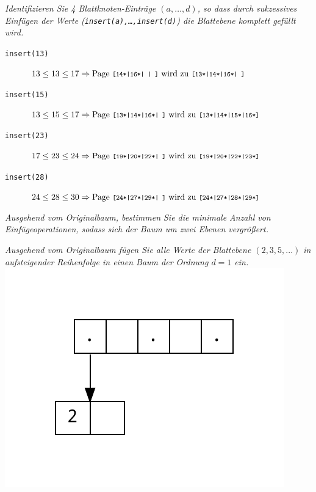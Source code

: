 \documentclass{uni_tue_template}
\newcommand{\code}[1]{\texttt{{\footnotesize #1}}}
\begin{document}
\exercise{}
  \item \emph{Identifizieren Sie 4 Blattknoten-Einträge $(a,\ldots,d)$, so dass durch sukzessives Einfügen der Werte (\code{insert(a),\ldots,insert(d)}) die Blattebene komplett gefüllt wird.}
  \begin{description}
    \item[\code{insert(13)}] $13 \leq 13 \leq 17 \Rightarrow \text{Page \code{[14*|16*|   |   ]} wird zu \code{[13*|14*|16*|   ]}}$
    \item[\code{insert(15)}] $13 \leq 15 \leq 17 \Rightarrow \text{Page \code{[13*|14*|16*|   ]} wird zu \code{[13*|14*|15*|16*]}}$
    \item[\code{insert(23)}] $17 \leq 23 \leq 24 \Rightarrow \text{Page \code{[19*|20*|22*|   ]} wird zu \code{[19*|20*|22*|23*]}}$
    \item[\code{insert(28)}] $24 \leq 28 \leq 30 \Rightarrow \text{Page \code{[24*|27*|29*|   ]} wird zu \code{[24*|27*|28*|29*]}}$
  \end{description}
  \item \emph{Ausgehend vom Originalbaum, bestimmen Sie die minimale Anzahl von Einfügeoperationen, sodass
  sich der Baum um zwei Ebenen vergrößert.}\\
  \item \emph{Ausgehend vom Originalbaum fügen Sie alle Werte der Blattebene $(2, 3, 5, . . .)$ in aufsteigender Reihenfolge in einen Baum der Ordnung $d = 1$ ein.}\\
  \includegraphics[scale=0.4]{./dot/A1_1-01.pdf}\\
\end{document}
